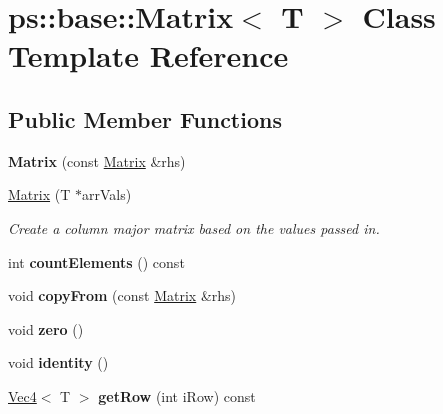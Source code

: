 \hypertarget{classps_1_1base_1_1Matrix}{}\section{ps\+:\+:base\+:\+:Matrix$<$ T $>$ Class Template Reference}
\label{classps_1_1base_1_1Matrix}
\subsection*{Public Member Functions}
\begin{DoxyCompactItemize}
\item 
\hypertarget{classps_1_1base_1_1Matrix_a2b9917b586c60ca8fc4b99e06793765f}{}{\bfseries Matrix} (const \hyperlink{classps_1_1base_1_1Matrix}{Matrix} \&rhs)\label{classps_1_1base_1_1Matrix_a2b9917b586c60ca8fc4b99e06793765f}

\item 
\hyperlink{classps_1_1base_1_1Matrix_a53a094b55f097a8aae15f2d91dfc1b1a}{Matrix} (T $\ast$arr\+Vals)
\begin{DoxyCompactList}\small\item\em Create a column major matrix based on the values passed in. \end{DoxyCompactList}\item 
\hypertarget{classps_1_1base_1_1Matrix_aeecb63d139340a9ee70ee4c06dfcb4cb}{}int {\bfseries count\+Elements} () const \label{classps_1_1base_1_1Matrix_aeecb63d139340a9ee70ee4c06dfcb4cb}

\item 
\hypertarget{classps_1_1base_1_1Matrix_a47db7bb336a422861f511d57afeb5de9}{}void {\bfseries copy\+From} (const \hyperlink{classps_1_1base_1_1Matrix}{Matrix} \&rhs)\label{classps_1_1base_1_1Matrix_a47db7bb336a422861f511d57afeb5de9}

\item 
\hypertarget{classps_1_1base_1_1Matrix_a63a0e6b8049c5cbbf66188a52239c8c0}{}void {\bfseries zero} ()\label{classps_1_1base_1_1Matrix_a63a0e6b8049c5cbbf66188a52239c8c0}

\item 
\hypertarget{classps_1_1base_1_1Matrix_a52957d0c22a48859fbaea253c2022c72}{}void {\bfseries identity} ()\label{classps_1_1base_1_1Matrix_a52957d0c22a48859fbaea253c2022c72}

\item 
\hypertarget{classps_1_1base_1_1Matrix_a43662dc4d323f84413bba61b64f7fec6}{}\hyperlink{classps_1_1base_1_1Vec4}{Vec4}$<$ T $>$ {\bfseries get\+Row} (int i\+Row) const \label{classps_1_1base_1_1Matrix_a43662dc4d323f84413bba61b64f7fec6}


\end{DoxyCompactItemize}
